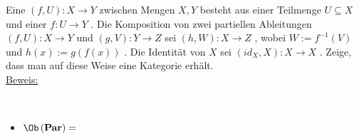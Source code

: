 
Eine  
\begin{math}
	\left( f, U \right): X \to Y 
\end{math}
zwischen Mengen 
\begin{math}
	X,Y
\end{math}
besteht aus einer Teilmenge 
\begin{math}
	U \subseteq X
\end{math}
und einer \Abb 
\begin{math}
	f: U \to Y 
\end{math}
. 
Die Komposition von zwei partiellen Ableitungen 
\begin{math}
	\left(f,U \right): X \to Y 
\end{math}
und
\begin{math}
	\left(g,V \right) :Y \to Z 
\end{math}
sei 
\begin{math}
	\left( h,W \right) : X \to Z 
\end{math}
, wobei 
\begin{math}
	W:= f^{-1} \left( V \right)
\end{math}
und 
\begin{math}
	h(x) := g \left( f(x) \right)
\end{math}
.
Die Identit\"at von 
\begin{math}
	X
\end{math}
sei 
\begin{math}
	\left( id_X , X \right) : X \to X
\end{math}
.
Zeige, dass man auf diese Weise eine Kategorie \Par erh\"alt.	
\\
\underline{Beweis:}
	
\\
\begin{itemize}
	\item
		\begin{math}
			\Ob \left( \Par \right)=
		\end{math}


\end{itemize}
